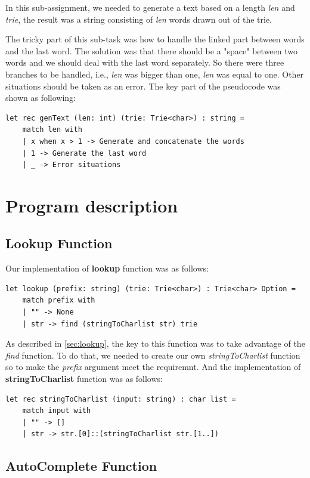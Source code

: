 \documentclass{article}
\begin{document}
In this sub-assignment, we needed to generate a text based on a length \emph{len} and \emph{trie}, the result was a string consisting of \emph{len} words drawn out of the trie.

The tricky part of this sub-task was how to handle the linked part between words and the last word. The solution was that there should be a "space" between two words and we should deal with the last word separately. So there were three branches to be handled, i.e., \emph{len} was bigger than one, \emph{len} was equal to one. Other situations should be taken as an error. The key part of the pseudocode was shown as following:

\begin{lstlisting}
let rec genText (len: int) (trie: Trie<char>) : string =
    match len with
    | x when x > 1 -> Generate and concatenate the words
    | 1 -> Generate the last word
    | _ -> Error situations
\end{lstlisting}

\section{Program description}
\subsection{Lookup Function}

Our implementation of \textbf{lookup} function was as follows:

\begin{lstlisting}
let lookup (prefix: string) (trie: Trie<char>) : Trie<char> Option = 
    match prefix with
    | "" -> None
    | str -> find (stringToCharlist str) trie    
\end{lstlisting}

As described in \ref{sec:lookup}, the key to this function was to take advantage of the \emph{find} function. To do that, we needed to create our own \emph{stringToCharlist} function so to make the \emph{prefix} argument meet the requiremnt. And the implementation of \textbf{stringToCharlist} function was as follows: 

\begin{lstlisting}
let rec stringToCharlist (input: string) : char list = 
    match input with
    | "" -> []
    | str -> str.[0]::(stringToCharlist str.[1..])     
\end{lstlisting}

\subsection{AutoComplete Function}
\end{document}
